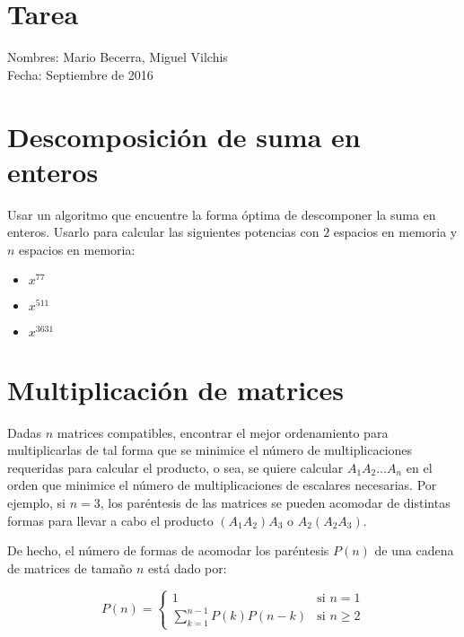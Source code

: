 \documentclass{article}
\begin{document}
\section*{Tarea}

Nombres: Mario Becerra, Miguel Vilchis \\
Fecha: Septiembre de 2016


\section{Descomposición de suma en enteros}

Usar un algoritmo que encuentre la forma óptima de descomponer la suma en enteros. Usarlo para calcular las siguientes potencias con $2$ espacios en memoria y $n$ espacios en memoria:

\begin{multicols}{3}
    \begin{itemize}
        \item $x^{77}$
        \item $x^{511}$
        \item $x^{3631}$
    \end{itemize}
    \end{multicols}


\section{Multiplicación de matrices}

Dadas $n$ matrices compatibles, encontrar el mejor ordenamiento para multiplicarlas de tal forma que se minimice el número de multiplicaciones requeridas para calcular el producto, o sea, se quiere calcular $A_1 A_2 \hdots A_n$ en el orden que minimice el número de multiplicaciones de escalares necesarias. Por ejemplo, si $n = 3$, los paréntesis de las matrices se pueden acomodar de distintas formas para llevar a cabo el producto $(A_1 A_2)A_3$ o $A_2(A_2 A_3)$.

De hecho, el número de formas de acomodar los paréntesis $P(n)$ de una cadena de matrices de tamaño $n$ está dado por:

\begin{equation*}
P(n) = \left\{
	\begin{array}{ll}
		1                          & \mbox{si } n = 1 \\
		\sum_{k=1}^{n-1}P(k)P(n-k) & \mbox{si } n \ge 2
	\end{array}
\right.
\end{equation*}
\end{document}
